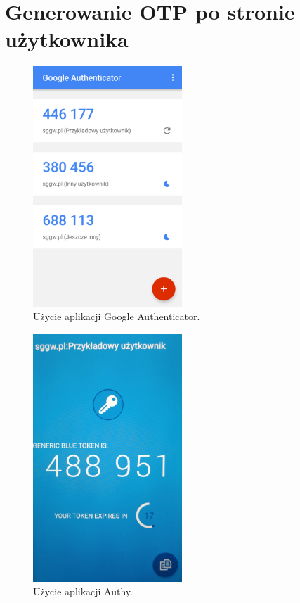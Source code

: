 \section{Generowanie OTP po stronie użytkownika}
\begin{figure}[t]
    \centering
	\includegraphics[width=0.5\textwidth]{content/images/mobile-google}
	\caption{Użycie aplikacji Google Authenticator.}
    \label{mobile-google}
\end{figure}
\begin{figure}[t]
    \centering
	\includegraphics[width=0.5\textwidth]{content/images/mobile-authy}
	\caption{Użycie aplikacji Authy.}
    \label{mobile-authy}
\end{figure}

